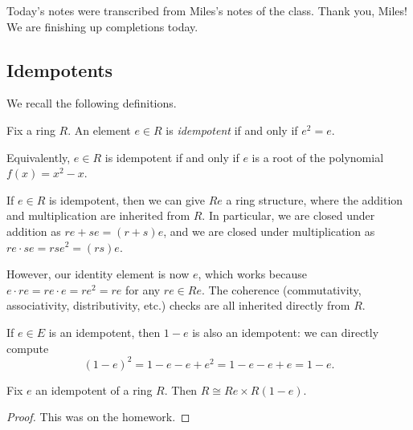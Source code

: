 \documentclass[../notes.tex]{subfiles}
\begin{document}

Today's notes were transcribed from Miles's notes of the class. Thank you, Miles! We are finishing up completions today.

\subsection{Idempotents}
We recall the following definitions.
\begin{definition}[Idempotent]
	Fix a ring $R$. An element $e\in R$ is \textit{idempotent} if and only if $e^2=e$.
\end{definition}
\begin{remark}
	Equivalently, $e\in R$ is idempotent if and only if $e$ is a root of the polynomial $f(x)=x^2-x$.
\end{remark}
\begin{remark}
	If $e\in R$ is idempotent, then we can give $Re$ a ring structure, where the addition and multiplication are inherited from $R$. In particular, we are closed under addition as $re+se=(r+s)e$, and we are closed under multiplication as $re\cdot se=rse^2=(rs)e$.
	
	However, our identity element is now $e$, which works because $e\cdot re=re\cdot e=re^2=re$ for any $re\in Re$. The coherence (commutativity, associativity, distributivity, etc.) checks are all inherited directly from $R$.
\end{remark}
\begin{example} \label{ex:subfromoneidemp}
	If $e\in E$ is an idempotent, then $1-e$ is also an idempotent: we can directly compute
	\[(1-e)^2=1-e-e+e^2=1-e-e+e=1-e.\]
\end{example}
\begin{lemma} \label{lem:basicidempdecomp}
	Fix $e$ an idempotent of a ring $R$. Then $R\cong Re\times R(1-e)$.
\end{lemma}
\begin{proof}
	This was on the homework.
\end{proof}
\end{document}
